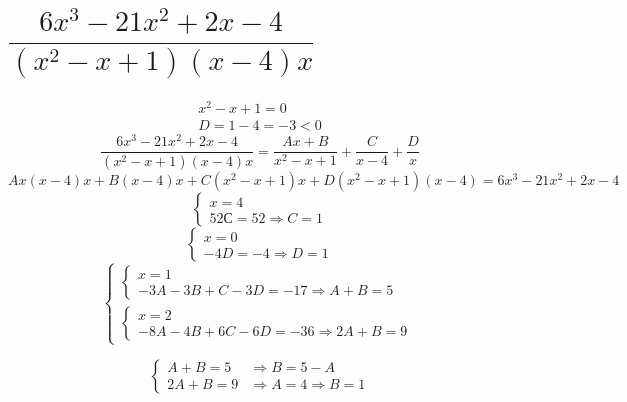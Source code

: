 \documentclass[12pt]{article}
\begin{document}
\begin{sloppypar}

    \section{$\dfrac{6x^3 - 21x^2 + 2x - 4}{(x^2 - x + 1)(x - 4)x}$}
    \[
        \begin{array}{ll}
            x^2 - x + 1 = 0 \\
            D = 1 - 4 = -3 < 0
        \end{array}
    \]
    \[
        \dfrac{6x^3 - 21x^2 + 2x - 4}{(x^2 - x + 1)(x - 4)x} = \dfrac{Ax + B}{x^2 - x + 1} + \dfrac{C}{x - 4} + \dfrac{D}{x}
    \]
    \[
        Ax(x-4)x + B(x-4)x + C(x^2 - x + 1)x + D(x^2 - x + 1)(x - 4) = 6x^3 - 21x^2 + 2x - 4
    \]
    \[
        \left\{\begin{array}{ll}
            x = 4 \\
            52С = 52 \Rightarrow C = 1
        \end{array}\right.
    \]
    \[
        \left\{\begin{array}{ll}
            x = 0 \\
            -4D = -4 \Rightarrow D = 1
        \end{array}\right.
    \]
    \[
        \left\{\begin{array}{ll}
            \left\{\begin{array}{ll}
                       x = 1 \\
                       -3A - 3B + C - 3D = -17 \Rightarrow A + B = 5
                   \end{array}\right. \\
            \left\{\begin{array}{ll}
                       x = 2 \\
                       -8A - 4B + 6C - 6D = -36 \Rightarrow 2A + B = 9
                   \end{array}\right.
        \end{array}\right.
    \]

    \[
        \left\{\begin{array}{ll}
            A + B = 5  & \Rightarrow B = 5 - A               \\
            2A + B = 9 & \Rightarrow A = 4 \Rightarrow B = 1
        \end{array}\right.
    \]



\end{sloppypar}
\end{document}
